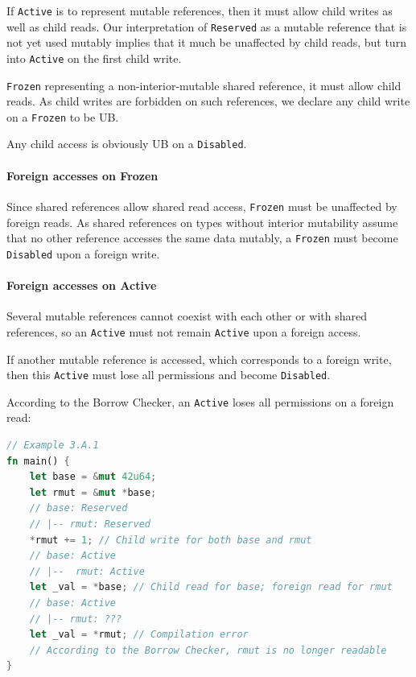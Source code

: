 \documentclass[a4paper,11pt]{article}
\theoremstyle{plain}
\theoremstyle{definition}
\theoremstyle{remark}
\newcommand{\tperm}[1]{\texttt{#1}}
\begin{document}
If \tperm{Active} is to represent mutable references, then it must allow child writes
as well as child reads. Our interpretation of \tperm{Reserved} as a mutable reference
that is not yet used mutably implies that it much be unaffected by child reads,
but turn into \tperm{Active} on the first child write.

\tperm{Frozen} representing a non-interior-mutable shared reference, it must allow
child reads. As child writes are forbidden on such references, we declare any
child write on a \tperm{Frozen} to be UB.

Any child access is obviously UB on a \tperm{Disabled}.

\paragraph*{Foreign accesses on Frozen}

Since shared references allow shared read access, \tperm{Frozen} must be unaffected
by foreign reads. As shared references on types without interior mutability
assume that no other reference accesses the same data mutably, a \tperm{Frozen} must
become \tperm{Disabled} upon a foreign write.

\paragraph*{Foreign accesses on Active}

Several mutable references cannot coexist with each other or with shared
references, so an \tperm{Active} must not remain \tperm{Active} upon a foreign access.

If another mutable reference is accessed, which corresponds to a foreign write,
then this \tperm{Active} must lose all permissions and become \tperm{Disabled}.

According to the Borrow Checker, an \tperm{Active} loses all permissions on a foreign read:
\begin{lstlisting}[language=rust]
// Example 3.A.1
fn main() {
    let base = &mut 42u64;
    let rmut = &mut *base;
    // base: Reserved
    // |-- rmut: Reserved
    *rmut += 1; // Child write for both base and rmut
    // base: Active
    // |--  rmut: Active
    let _val = *base; // Child read for base; foreign read for rmut
    // base: Active
    // |-- rmut: ???
    let _val = *rmut; // Compilation error
    // According to the Borrow Checker, rmut is no longer readable
}
\end{lstlisting}
\end{document}
